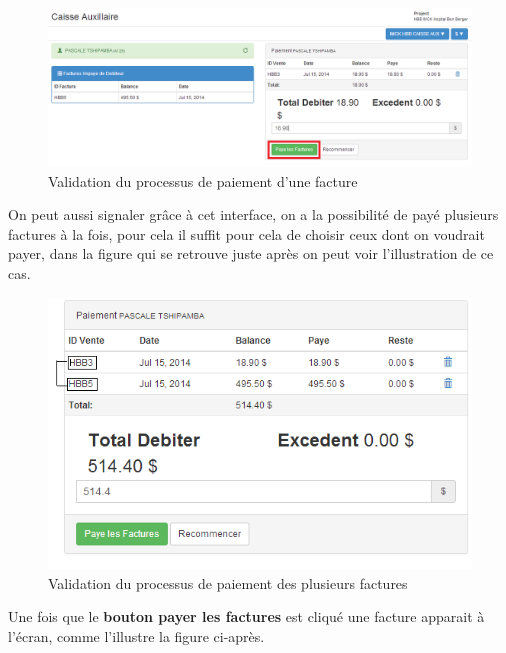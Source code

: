 \documentclass[12pt,a4paper]{report}
\begin{document}
\begin{figure}[h]
\begin{center}
\includegraphics[width=12cm]{pic/PaidInvoiceOK.png}
\end{center}
\caption{Validation du processus de paiement d'une facture}
\label{Validation du processus de paiement d'une facture}
\end{figure}
\newpage
On peut aussi signaler grâce à cet interface, on a la possibilité de payé plusieurs factures à la fois, pour cela il suffit pour cela de choisir ceux dont on voudrait payer, dans la figure qui se retrouve juste après on peut voir l'illustration de ce cas.

\begin{figure}[h]
\begin{center}
\includegraphics[width=12cm]{pic/PaidDoubleFact.png}
\end{center}
\caption{Validation du processus de paiement des plusieurs factures}
\label{Validation du processus de paiement des plusieurs factures}
\end{figure}
Une fois que le \textbf{bouton payer les factures} est cliqué une facture apparait à l'écran, comme l'illustre la figure ci-après.
\end{document}
